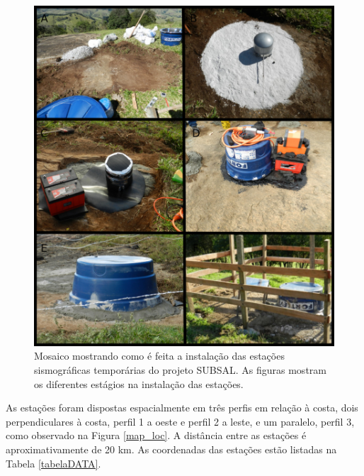 \begin{figure}[!ht]
\centering
\includegraphics[scale=0.45]{Figs/instalacao.png}
\caption[Mosaico mostrando como é feita a instalação das estações sismográficas temporárias do projeto SUBSAL.]{Mosaico mostrando como é feita a instalação das estações sismográficas temporárias do projeto SUBSAL. As figuras mostram os diferentes estágios na instalação das estações.}
\label{instalacao}
\end{figure} 

As estações foram dispostas espacialmente em três perfis em relação à costa, dois perpendiculares à costa, perfil 1 a oeste e perfil 2 a leste, e um paralelo, perfil 3, como observado na Figura \ref{map_loc}. A distância entre as estações é aproximativamente de 20 km. As coordenadas das estações estão listadas na Tabela \ref{tabelaDATA}. 

